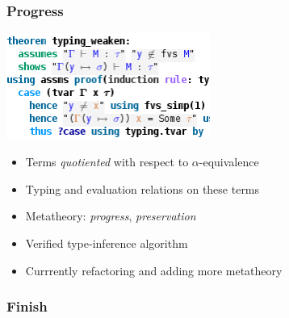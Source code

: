\documentclass{beamer}
\begin{document}
\begin{frame}
\frametitle{Progress}
\begin{center}
\includegraphics[width=0.5\textwidth]{screenshot}
\end{center}

\begin{itemize}
\item Terms \emph{quotiented} with respect to $\alpha$-equivalence
\item Typing and evaluation relations on these terms
\item Metatheory: \emph{progress}, \emph{preservation}
\item Verified type-inference algorithm
\item Currrently refactoring and adding more metatheory
\end{itemize}
\end{frame}

\begin{frame}
\frametitle{Finish}
\end{frame}
\end{document}
